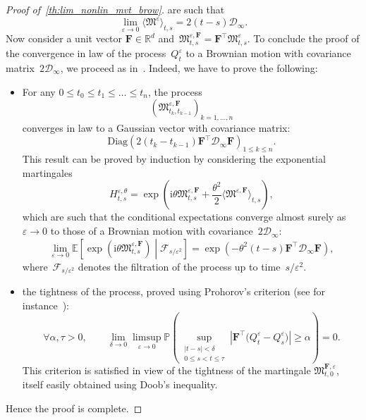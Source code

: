 \documentclass[onefignum,onetabnum]{siamart251216} %
\newcommand{\mc}[1]{\mathcal{#1}}
\renewcommand{\leq}{\leqslant}
\renewcommand{\geq}{\geqslant}
\newcommand{\eps}{\varepsilon}
\theoremstyle{plain}
\numberwithin{equation}{section}
\numberwithin{theorem}{section}
\begin{document}
\begin{proof}[Proof of~\cref{th:lim_nonlin_mvt_brow}]
    are such that
    \[
    \lim_{\eps \to 0} \langle \mathfrak{M}^{\eps} \rangle_{t,s} = 2(t - s)\mc{D}_\infty.
    \]
    Now consider a unit vector $\mathbf{F} \in \mathbb{R}^d$ and~$\mathfrak{M}^{\eps, \mathbf{F}}_{t,s} = \mathbf{F}^\top \mathfrak{M}^{\eps}_{t,s}$.
    To conclude the proof of the convergence in law of the process~$Q^\eps_t$ to a Brownian motion with covariance matrix~$2\mc{D}_\infty$, we proceed as in~\cite[Proof of Theorem 1.5]{olla1994homogenization}. Indeed, we have to prove the following:
    \begin{itemize}
        \item For any $0\leq t_0 \leq t_1 \leq \dots \leq t_n$, the process
        \[
        \left( \mathfrak{M}^{\eps, \mathbf{F}}_{t_k, t_{k-1}} \right)_{k=1,\dots,n}
        \]
        converges in law to a Gaussian vector with covariance matrix:
        \[
        \text{Diag} \left( 2(t_k - t_{k-1}) \mathbf{F}^\top \mc{D}_\infty \mathbf{F} \right)_{1\leq k\leq n}.
        \]
        This result can be proved by induction by considering the exponential martingales
        \[
        H^{\eps, \theta}_{t, s} = \exp \left( \mathrm{i}\theta \mathfrak{M}^{\eps, \mathbf{F}}_{t, s} + \frac{\theta^2}{2}      \langle \mathfrak{M}^{\eps, \mathbf{F}} \rangle_{t,s} \right),
        \]
        which are such that the conditional expectations converge almost surely as~$\eps \to 0$ to those of a Brownian motion with covariance~$2\mc{D}_\infty$:
        \[
        \lim_{\eps \to 0} \mathbb{E} \left[ \exp \left( \mathrm{i}\theta \mathfrak{M}^{\eps, \mathbf{F}}_{t, s}\right)\middle| \mc{F}_{s/\eps^2} \right] = \exp \left( -\theta^2(t - s) \mathbf{F}^\top \mc{D}_\infty \mathbf{F} \right),
        \]
        where~$\mc{F}_{s/\eps^2}$ denotes the filtration of the process up to time~$s/\eps^2$.
        \item the tightness of the process, proved using Prohorov's criterion (see for instance~\cite{billingsley2013convergence}):
        \[
        \forall \alpha, \tau > 0, \qquad \lim_{\delta \to 0} \limsup_{\eps \to 0} \mathbb{P}\left( \sup_{\substack{ |t-s|<\delta \\ 0 \leq s < t \leq \tau}} \left|  \mathbf{F}^\top \Big( Q_{t}^{\eps} - Q_s^{\eps} \Big)\right| \geq \alpha \right) = 0.
        \]
        This criterion is satisfied in view of the tightness of the martingale $\mathfrak{M}^{\mathbf{F},\eps}_{t,0}$, itself easily obtained using Doob's inequality.%
    \end{itemize}
    Hence the proof is complete.
\end{proof}
\end{document}
